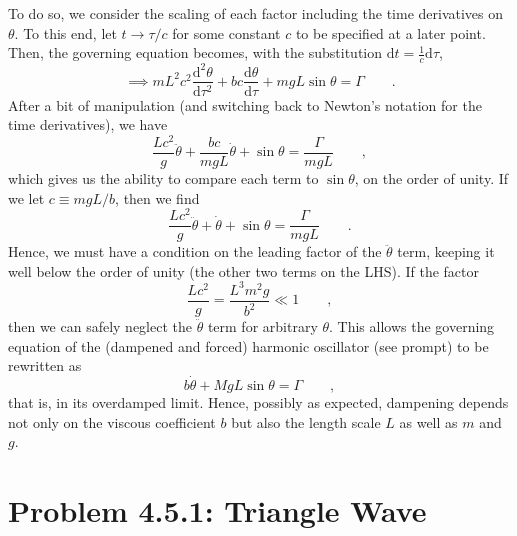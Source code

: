 \documentclass[draft]{agujournal2019}
\begin{document}
To do so, we consider the scaling of each factor including the time derivatives on $\theta$. To this end, let $t\longrightarrow \tau/c$ for some constant $c$ to be specified at a later point. Then, the governing equation becomes, with the substitution $\mathrm{d}t = \frac{1}{c}\mathrm{d}\tau$, 
\begin{equation*}
    \implies m L^2 c^2 \frac{\mathrm{d}^2\theta}{\mathrm{d}\tau^2} + b c \frac{\mathrm{d}\theta}{\mathrm{d}\tau} + m g L \sin{\theta} = \Gamma \qquad .
\end{equation*}
After a bit of manipulation (and switching back to Newton's notation for the time derivatives), we have
\begin{equation*}
    \frac{L c^2}{g} \ddot \theta + \frac{b c}{m g L} \dot \theta + \sin{\theta} = \frac{\Gamma}{m g L} \qquad ,
\end{equation*}
which gives us the ability to compare each term to $\sin{\theta}$, on the order of unity. If we let $c\equiv mg L/b$, then we find
\begin{equation*}
    \frac{Lc^2}{g} \ddot \theta + \dot \theta + \sin{\theta} = \frac{\Gamma}{m g L} \qquad .
\end{equation*}
Hence, we must have a condition on the leading factor of the $\ddot \theta$ term, keeping it well below the order of unity (the other two terms on the LHS). If the factor 
\begin{equation*}
    \frac{Lc^2}{g} = \frac{L^3 m^2 g}{b^2} \ll 1 \qquad ,
\end{equation*}
then we can safely neglect the $\ddot \theta$ term for arbitrary $\theta$. This allows the governing equation of the (dampened and forced) harmonic oscillator (see prompt) to be rewritten as
\begin{equation*}
    b \dot \theta + MgL \sin{\theta}=\Gamma \qquad ,
\end{equation*}
that is, in its overdamped limit. Hence, possibly as expected, dampening depends not only on the viscous coefficient $b$ but also the length scale $L$ as well as $m$ and $g$. 




\section{Problem 4.5.1: Triangle Wave}
\label{sec:p7}
\end{document}
